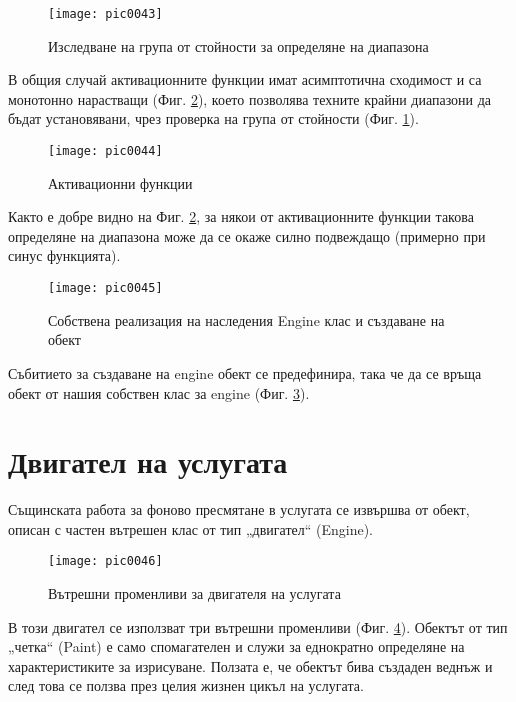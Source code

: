 \begin{figure}[h]
  \centering
  \texttt{[image: pic0043]}
  \caption{Изследване на група от стойности за определяне на диапазона}
\label{fig:pic0043}
\end{figure}
\FloatBarrier

В общия случай активационните функции имат асимптотична сходимост и са монотонно нарастващи (Фиг. \ref{fig:pic0044}), което позволява техните крайни диапазони да бъдат установявани, чрез проверка на група от стойности (Фиг. \ref{fig:pic0043}).

\begin{figure}[h]
  \centering
  \texttt{[image: pic0044]}
  \caption{Активационни функции \cite{afwiki}}
\label{fig:pic0044}
\end{figure}
\FloatBarrier

Както е добре видно на Фиг. \ref{fig:pic0044}, за някои от активационните функции такова определяне на диапазона може да се окаже силно подвеждащо (примерно при синус функцията). 

\begin{figure}[h]
  \centering
  \texttt{[image: pic0045]}
  \caption{Собствена реализация на наследения Engine клас и създаване на обект}
\label{fig:pic0045}
\end{figure}
\FloatBarrier

Събитието за създаване на engine обект се предефинира, така че да се връща обект от нашия собствен клас за engine (Фиг. \ref{fig:pic0045}). 

\section{Двигател на услугата}

Същинската работа за фоново пресмятане в услугата се извършва от обект, описан с частен вътрешен клас от тип „двигател“ (Engine).

\begin{figure}[h]
  \centering
  \texttt{[image: pic0046]}
  \caption{Вътрешни променливи за двигателя на услугата}
\label{fig:pic0046}
\end{figure}
\FloatBarrier

В този двигател се използват три вътрешни променливи (Фиг. \ref{fig:pic0046}). Обектът от тип „четка“ (Paint) е само спомагателен и служи за еднократно определяне на характеристиките за изрисуване. Ползата е, че обектът бива създаден веднъж и след това се ползва през целия жизнен цикъл на услугата. 

